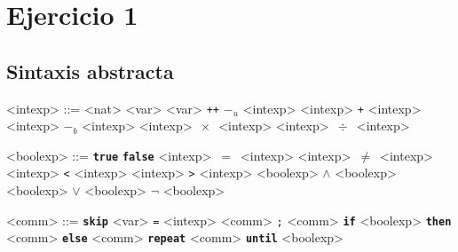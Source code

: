 \documentclass{article}
\begin{document}
\section*{Ejercicio 1}
\subsection*{Sintaxis abstracta}
\begin{grammar}

<intexp> ::= <nat> 
        \alt <var> 
        \alt <var> \texttt{++} 
        \alt \texttt{$-_{u}$} <intexp> 
        \alt <intexp> \texttt{+} <intexp>
        \alt <intexp> \texttt{$-_{b}$} <intexp>
        \alt <intexp> $\,\times\,$ <intexp>
        \alt <intexp> $\,\div\,$ <intexp>
        
<boolexp> ::= \textbf{\texttt{true}}
        \alt \textbf{\texttt{false}}
        \alt <intexp> $\,=\,$ <intexp>
        \alt <intexp> $\,\neq\,$ <intexp>
        \alt <intexp> \texttt{\textless} <intexp>
        \alt <intexp> \texttt{\textgreater} <intexp>
        \alt <boolexp> \(\land\) <boolexp>
        \alt <boolexp> \(\lor\) <boolexp>
        \alt \(\lnot\) <boolexp>


<comm> ::= \textbf{\texttt{skip}}
        \alt <var> \texttt{=} <intexp>
        \alt <comm> \texttt{;} <comm>
        \alt \textbf{\texttt{if}} <boolexp> \textbf{\texttt{then}} <comm> \textbf{\texttt{else}} <comm> 
        \alt \textbf{\texttt{repeat}} <comm> \textbf{\texttt{until}} <boolexp>


\end{grammar}
\end{document}
